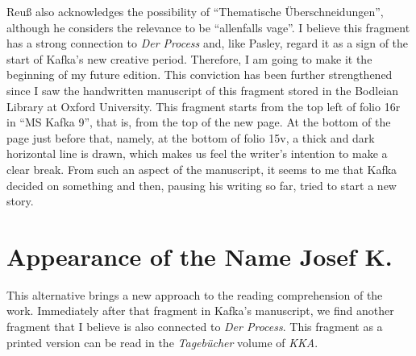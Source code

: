 \documentclass{article}
\begin{document}
Reuß also acknowledges the possibility of ``Thematische
Überschneidungen'', although he considers the relevance to be
``allenfalls vage''. I believe this fragment has a strong connection to
\emph{Der Process} and, like Pasley, regard it as a sign of the start of
Kafka's new creative period. Therefore, I am going to make it the
beginning of my future edition. This conviction has been further
strengthened since I saw the handwritten manuscript of this fragment
stored in the Bodleian Library at Oxford University. This fragment
starts from the top left of folio 16r in ``MS Kafka 9'', that is, from
the top of the new page. At the bottom of the page just before that,
namely, at the bottom of folio 15v, a thick and dark horizontal line is
drawn, which makes us feel the writer's intention to make a clear break.
From such an aspect of the manuscript, it seems to me that Kafka decided
on something and then, pausing his writing so far, tried to
start a new story.

\section{Appearance of the Name Josef
K.}\label{appearance-of-the-name-josef-k.}

This alternative brings a new approach to the reading comprehension of
the work. Immediately after that fragment in Kafka's manuscript, we find
another fragment that I believe is also connected to \emph{Der Process}.
This fragment as a printed version can be read in the \emph{Tagebücher}
volume of \emph{KKA}.
\end{document}
